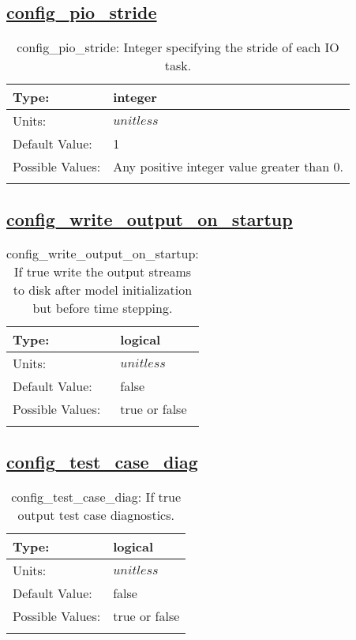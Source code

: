 \subsection[config\_pio\_stride]{\hyperref[sec:nm_tab_io]{config\_pio\_stride}}
\label{subsec:nm_sec_config_pio_stride}
\begin{center}
\begin{longtable}{| p{2.0in} || p{4.0in} |}
    \hline
    Type: & integer \\
    \hline
    Units: & $unitless$ \\
    \hline
    Default Value: & 1 \\
    \hline
    Possible Values: & Any positive integer value greater than 0. \\
    \hline
    \caption{config\_pio\_stride: Integer specifying the stride of each IO task.}
\end{longtable}
\end{center}
\subsection[config\_write\_output\_on\_startup]{\hyperref[sec:nm_tab_io]{config\_write\_output\_on\_startup}}
\label{subsec:nm_sec_config_write_output_on_startup}
\begin{center}
\begin{longtable}{| p{2.0in} || p{4.0in} |}
    \hline
    Type: & logical \\
    \hline
    Units: & $unitless$ \\
    \hline
    Default Value: & false \\
    \hline
    Possible Values: & true or false \\
    \hline
    \caption{config\_write\_output\_on\_startup: If true write the output streams to disk after model initialization but before time stepping.}
\end{longtable}
\end{center}
\subsection[config\_test\_case\_diag]{\hyperref[sec:nm_tab_io]{config\_test\_case\_diag}}
\label{subsec:nm_sec_config_test_case_diag}
\begin{center}
\begin{longtable}{| p{2.0in} || p{4.0in} |}
    \hline
    Type: & logical \\
    \hline
    Units: & $unitless$ \\
    \hline
    Default Value: & false \\
    \hline
    Possible Values: & true or false \\
    \hline
    \caption{config\_test\_case\_diag: If true output test case diagnostics.}
\end{longtable}
\end{center}
